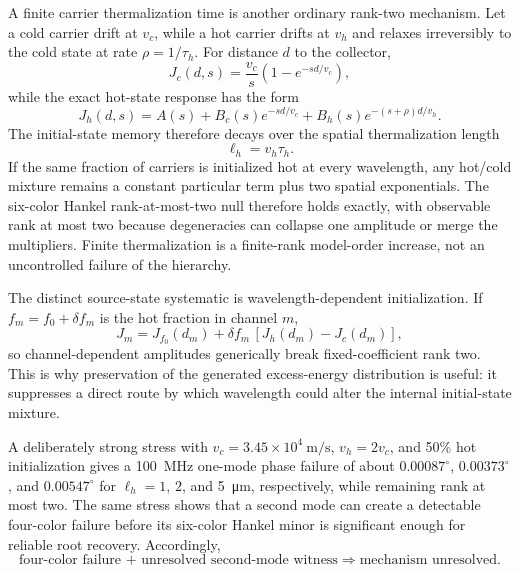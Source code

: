 \documentclass[11pt]{article}
\begin{document}
A finite carrier thermalization time is another ordinary rank-two mechanism. Let a cold carrier drift at $v_c$, while a hot carrier drifts at $v_h$ and relaxes irreversibly to the cold state at rate $\rho=1/\tau_h$. For distance $d$ to the collector,
\begin{equation}
J_c(d,s)=\frac{v_c}{s}\left(1-e^{-sd/v_c}\right),
\end{equation}
while the exact hot-state response has the form
\begin{equation}
\boxed{J_h(d,s)=A(s)+B_c(s)e^{-sd/v_c}+B_h(s)e^{-(s+\rho)d/v_h}.}
\label{eq:hot_two_mode}
\end{equation}
The initial-state memory therefore decays over the spatial thermalization length
\begin{equation}
\boxed{\ell_h=v_h\tau_h.}
\end{equation}
If the same fraction of carriers is initialized hot at every wavelength, any hot/cold mixture remains a constant particular term plus two spatial exponentials. The six-color Hankel rank-at-most-two null therefore holds exactly, with observable rank at most two because degeneracies can collapse one amplitude or merge the multipliers. Finite thermalization is a finite-rank model-order increase, not an uncontrolled failure of the hierarchy.

The distinct source-state systematic is wavelength-dependent initialization. If $f_m=f_0+\delta f_m$ is the hot fraction in channel $m$,
\begin{equation}
J_m=J_{f_0}(d_m)+\delta f_m\,[J_h(d_m)-J_c(d_m)],
\end{equation}
so channel-dependent amplitudes generically break fixed-coefficient rank two. This is why preservation of the generated excess-energy distribution is useful: it suppresses a direct route by which wavelength could alter the internal initial-state mixture.

A deliberately strong stress with $v_c=3.45\times10^4~\mathrm{m/s}$, $v_h=2v_c$, and 50\% hot initialization gives a \SI{100}{MHz} one-mode phase failure of about $0.00087^\circ$, $0.00373^\circ$, and $0.00547^\circ$ for $\ell_h=1$, $2$, and \SI{5}{\micro\meter}, respectively, while remaining rank at most two. The same stress shows that a second mode can create a detectable four-color failure before its six-color Hankel minor is significant enough for reliable root recovery. Accordingly,
\begin{equation*}
\boxed{\text{four-color failure + unresolved second-mode witness}\Rightarrow\text{mechanism unresolved}.}
\end{equation*}
\end{document}

